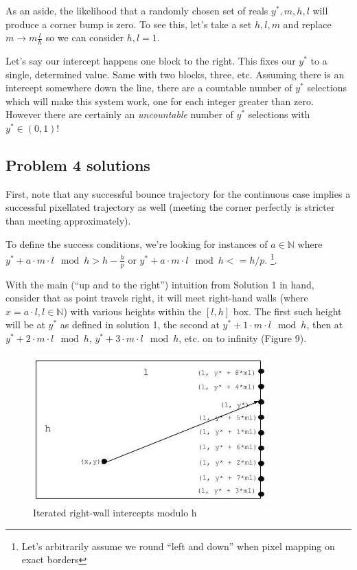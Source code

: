 \documentclass[11pt, oneside]{article} 	%
\begin{document}
As an aside, the likelihood that a randomly chosen set of reals $y^*, m, h, l$ will produce a corner bump is zero.  To see this, let's take a set $h, l, m$ and replace $m \rightarrow m \frac{l}{h}$ so we can consider $h, l = 1$. 

Let's say our intercept happens one block to the right. This fixes our $y^*$ to a single, determined value. Same with two blocks, three, etc. Assuming there is an intercept somewhere down the line, there are a countable number of $y^*$ selections which will make this system work, one for each integer greater than zero. However there are certainly an \emph{uncountable} number of $y^*$ selections with $y^* \in (0, 1)$!


\subsection{Problem 4 solutions}

First, note that any successful bounce trajectory for the continuous case implies a successful pixellated trajectory as well (meeting the corner perfectly is stricter than meeting approximately).

To define the success conditions, we're looking for instances of $a \in \mathbb{N}$ where $y^* + a \cdot m \cdot l \mod h > h - \frac{h}{p} $ or $y^* + a \cdot m \cdot l \mod h  <= h/p$. \footnote {Let's arbitrarily assume we round ``left and down'' when pixel mapping on exact borders}.

With the main (``up and to the right'') intuition from Solution 1 in hand, consider that as point travels right, it will meet right-hand walls (where $x = a \cdot l, l \in \mathbb{N}$) with various heights within the $[l, h]$ box.  The first such height will be at $y^*$ as defined in solution 1, the second at $y^* + 1 \cdot m \cdot l \mod h$, then at $y^* + 2 \cdot m \cdot l \mod h$, $y^* + 3 \cdot m \cdot l \mod h$, etc. on to infinity (Figure 9).



\begin{figure}[!htb]
\centering
\includegraphics[scale=.4]{iteratedintercepts}
\caption{Iterated right-wall intercepts modulo h}
\end{figure}
\end{document}
